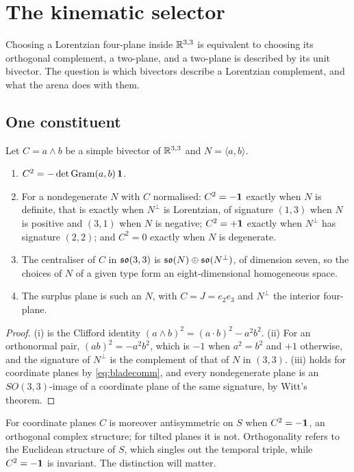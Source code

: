 \section{The kinematic selector}
\label{sec:selector}

Choosing a Lorentzian four-plane inside $\mathbb{R}^{3,3}$ is equivalent to choosing its orthogonal complement, a two-plane, and a two-plane is described by its unit
bivector. The question is which bivectors describe a Lorentzian complement, and what the arena does with them.

\subsection{One constituent}

\begin{theorem}
\label{thm:selector}
Let $C=a\wedge b$ be a simple bivector of $\mathbb{R}^{3,3}$ and $N=\langle a,b\rangle$.
\begin{enumerate}[label=(\roman*),leftmargin=2.2em]
\item $C^2=-\det\mathrm{Gram}(a,b)\,\mathbf 1$.
\item For a nondegenerate $N$ with $C$ normalised: $C^2=-\mathbf 1$ exactly when $N$ is definite, that is exactly when $N^\perp$ is Lorentzian, of signature $(1,3)$
when $N$ is positive and $(3,1)$ when $N$ is negative; $C^2=+\mathbf 1$ exactly when $N^\perp$ has signature $(2,2)$; and $C^2=0$ exactly when $N$ is degenerate.
\item The centraliser of $C$ in $\mathfrak{so}(3,3)$ is $\mathfrak{so}(N)\oplus\mathfrak{so}(N^\perp)$, of dimension seven, so the choices of $N$ of a given type form an eight-dimensional homogeneous
space.
\item The surplus plane is such an $N$, with $C=J=e_2e_3$ and $N^\perp$ the interior four-plane.
\end{enumerate}
\end{theorem}

\begin{proof}
(i) is the Clifford identity $(a\wedge b)^2=(a\cdot b)^2-a^2b^2$. (ii) For an orthonormal pair, $(ab)^2=-a^2b^2$, which is $-1$ when $a^2=b^2$ and $+1$ otherwise, and the
signature of $N^\perp$ is the complement of that of $N$ in $(3,3)$. (iii) holds for coordinate planes by \eqref{eq:bladecomm}, and every nondegenerate plane is an
$SO(3,3)$-image of a coordinate plane of the same signature, by Witt's theorem.
\end{proof}

For coordinate planes $C$ is moreover antisymmetric on $S$ when $C^2=-\mathbf 1$, an orthogonal complex structure; for tilted planes it is not. Orthogonality refers to the
Euclidean structure of $S$, which singles out the temporal triple, while $C^2=-\mathbf 1$ is invariant. The distinction will matter.

